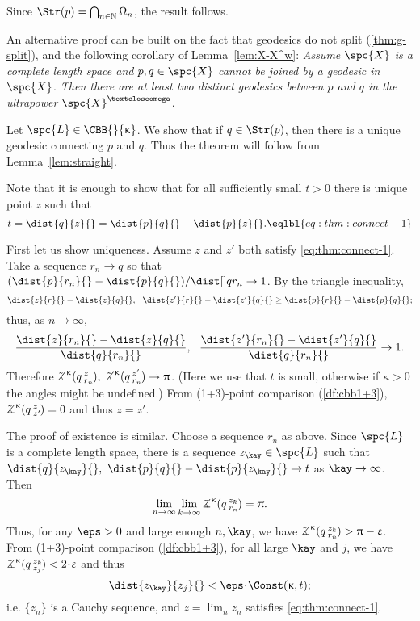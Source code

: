 Since $\Str(p)=\bigcap_{n\in \NN}\Omega_n$, the result follows.
\qeds

An alternative proof can be built on the fact that geodesics do not split (\ref{thm:g-split}),
and the following corollary of Lemma~\ref{lem:X-X^w}: 
\textit{Assume $\spc{X}$ is a complete length space 
and $p,q\in\spc{X}$ cannot be joined by a geodesic in $\spc{X}$.  Then there are at least two distinct geodesics between $p$ and $q$ 
in the ultrapower $\spc{X}^\o$}. 

Let $\spc{L}\in\CBB{}{\kappa}$.
We show that if $q\in \Str(p)$, then there is a unique geodesic connecting $p$ and $q$.
Thus the theorem will follow from Lemma~\ref{lem:straight}.

Note that it is enough to show that for all sufficiently small
$t>0$ there is unique point $z$ such that 
\[t
=
\dist{q}{z}{}
=
\dist{p}{q}{}-\dist{p}{z}{}.
\eqlbl{eq:thm:connect-1}\]

First let us show uniqueness. 
Assume $z$ and $z'$ both satisfy \ref{eq:thm:connect-1}.
Take a sequence $r_n\to q$ so that $(\dist{p}{r_n}{}-\dist{p}{q}{})/\dist[{{}}]{q}{r_n}{}\to 1$. 
By the triangle inequality, 
\[\dist{z}{r}{}-\dist{z}{q}{},\ \ \dist{z'}{r}{}-\dist{z'}{q}{}\ge \dist{p}{r}{}-\dist{p}{q}{};\] 
thus, as $n\to\infty$,
\[\frac{\dist{z}{r_n}{}-\dist{z}{q}{}}{\dist{q}{r_n}{}},
\ \ 
\frac{\dist{z'}{r_n}{}-\dist{z'}{q}{}}{\dist{q}{r_n}{}}
\to 1.\]
Therefore
 $\angk\kappa q z{r_n},\ \angk\kappa q{z'}{r_n}\to\pi$. (Here we use that $t$ is small, otherwise if $\kappa>0$ the angles might be undefined.)
From (1+3)-point comparison (\ref{df:cbb1+3}), $\angk\kappa q z {z'}=0$ and thus $z=z'$.

The proof of existence is similar.
Choose a sequence $r_n$ as above.
Since $\spc{L}$ is a complete length space, 
there is a sequence $z_\kay\in \spc{L}$ such that $\dist{q}{z_\kay}{},\ \dist{p}{q}{}-\dist{p}{z_\kay}{}\to t$ as $\kay\to\infty$.
Then 
\[
\lim_{n\to\infty}
\lim_{\kay\to\infty}
\angk\kappa q{z_\kay}{r_n}
=\pi.\] 
Thus, for any $\eps>0$ and large enough $n,\kay$, we have $\angk\kappa q{z_\kay}{r_n}>\pi-\eps$.
From (1+3)-point comparison (\ref{df:cbb1+3}), for all large $\kay$ and $j$, we have $\angk\kappa q{z_\kay}{z_j}<2\cdot\eps$ and thus 
\[\dist{z_\kay}{z_j}{}<\eps\cdot\Const(\kappa,t);\]
i.e. $\{z_n\}$ is a Cauchy sequence, and $z=\lim_n z_n$ satisfies \ref{eq:thm:connect-1}.
\qeds


